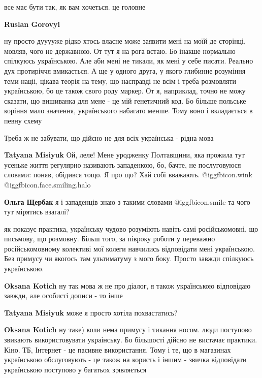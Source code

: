 \begin{itemize}
\begin{itemize} %
все має бути так, як вам хочеться. це головне

\textbf{Ruslan Gorovyi} 

ну просто дууууже рідко хтось власне може заявити мені на моїй де сторінці,
мовляв, чого не державною. От тут я на рога встаю. Бо інакше нормально
спілкуюсь українською. Але аби мені не тикали, як мені у себе писати. Реально
дух протиріччя вмикається. А ще у одного друга, у якого глибинне розуміння теми
націі, цікава теорія на тему, що насправді не всім і треба розмовляти
українською, бо це також свого роду маркер. От я, наприклад, точно не можу
сказати, що вишиванка для мене - це мій генетичний код. Бо більше польське
коріння мало значення, українського набагато менше. Тому воно і вкладається в
певну схему


Треба ж не забувати, що дійсно не для всіх українська - рідна мова

\textbf{Tatyana Misiyuk} Ой, леле! Мене уродженку Полтавщини, яка прожила тут усеньке життя регулярно називають западенкою, бо, бачте, не послуговуюся словами: поняв, обідився тощо. Я про що? Хай собі вважають.  @igg{fbicon.wink}  @igg{fbicon.face.smiling.halo} 

\textbf{Ольга Щербак} я і западенців знаю з такими словами  @igg{fbicon.smile}  та чого тут мірятись взагалі?
\end{itemize} %


як показує практика, українську чудово розуміють навіть самі російськомовні, що
письмову, що розмовну. Більш того, за півроку роботи у переважно
російськомовному колективі мої колеги навчились відповідати мені українською.
Без примусу чи якогось там ультиматуму з мого боку. Просто завжди спілкуюсь
українською.

\begin{itemize} %
\textbf{Oksana Kotich} ну так мова ж не про діалог, я також українською відповідаю завжди, але особисті дописи - то інше

\textbf{Tatyana Misiyuk} може я просто хотіла похвастатись?

\textbf{Oksana Kotich} ну таке) коли нема примусу і тикання носом. люди поступово звикають використовувати украінську. Бо більшості дійсно не вистачає практики. Кіно. ТБ, Інтернет - це пасивне використання. Тому і те, що в магазинах українською обслуговують - це також на користь і іншим - звичка відповідати українською поступово у багатьох з;являється
\end{itemize} %


\end{itemize}

